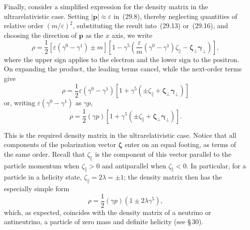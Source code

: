 Finally, consider a simplified expression for the density matrix in the ultrarelativistic case. Setting $|\mathbf{p}| \approx \varepsilon$ in~(29.8), thereby neglecting quantities of relative order $(m/\varepsilon)^2$, substituting the result into~(29.13) or~(29.16), and choosing the direction of $\mathbf{p}$ as the $x$ axis, we write
\[
\rho = \frac{1}{2}[\varepsilon(\gamma^0 - \gamma^1) \pm m]\left[1 - \gamma^5\left(\frac{\varepsilon}{m}(\gamma^0 - \gamma^1)\zeta_\| - \boldsymbol{\zeta}_\perp\boldsymbol{\gamma}_\perp\right)\right],
\]
where the upper sign applies to the electron and the lower sign to the positron. On expanding the product, the leading terms cancel, while the next-order terms give
\[
\rho = \frac{1}{2}\varepsilon(\gamma^0 - \gamma^1)[1 + \gamma^5(\pm\zeta_\| + \boldsymbol{\zeta}_\perp\boldsymbol{\gamma}_\perp)]
\]
or, writing $\varepsilon(\gamma^0 - \gamma^1)$ as $\gamma p$,
\begin{equation}
\rho = \frac{1}{2}(\gamma p)[1 + \gamma^5(\pm\zeta_\| + \boldsymbol{\zeta}_\perp\boldsymbol{\gamma}_\perp)].
\tag{29.21}
\end{equation}

This is the required density matrix in the ultrarelativistic case. Notice that all components of the polarization vector $\boldsymbol{\zeta}$ enter on an equal footing, as terms of the same order. Recall that $\zeta_\|$ is the component of this vector parallel to the particle momentum when $\zeta_\| > 0$ and antiparallel when $\zeta_\| < 0$. In particular, for a particle in a helicity state, $\zeta_\| = 2\lambda = \pm 1$; the density matrix then has the especially simple form
\begin{equation}
\rho = \frac{1}{2}(\gamma p)(1 \pm 2\lambda\gamma^5),
\tag{29.22}
\end{equation}
which, as expected, coincides with the density matrix of a neutrino or antineutrino, a particle of zero mass and definite helicity (see \S\,30).
